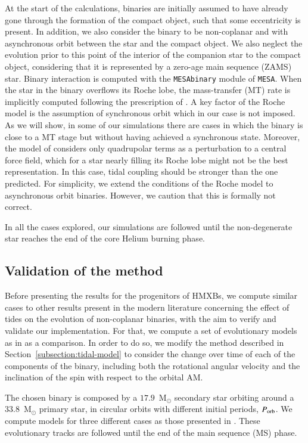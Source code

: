 \documentclass{aa}
\begin{document}
At the start of the calculations, binaries are initially assumed to have already gone through the formation of the compact object, such
that some eccentricity is present. In addition, we also consider the binary to be non-coplanar and with asynchronous orbit between the star
and the compact object. We also neglect the evolution prior to this point of the interior of the companion star to the compact object,
considering that it is represented by a zero-age main sequence (ZAMS) star. Binary interaction is computed with the {\tt MESAbinary} module
of {\tt MESA}. When the star in the binary overflows its Roche lobe, the mass-transfer (MT) rate is implicitly computed following the
prescription of \citet{kolb1990}. A key factor of the Roche model is the assumption of synchronous orbit which in our case is not imposed.
As we will show, in some of our simulations there are cases in which the binary is close to a MT stage but without having achieved a
synchronous state. Moreover, the model of \citet{hut1981} considers only quadrupolar terms as a perturbation to a central force field,
which for a star nearly filling its Roche lobe might not be the best representation. In this case, tidal coupling should be stronger than
the one predicted. For simplicity, we extend the conditions of the Roche model to asynchronous orbit binaries. However, we caution that
this is formally not correct.

In all the cases explored, our simulations are followed until the non-degenerate star reaches the end of the core Helium burning phase.

\subsection{Validation of the method}

Before presenting the results for the progenitors of HMXBs, we compute similar cases to other results present in the modern literature
concerning the effect of tides on the evolution of non-coplanar binaries, with the aim to verify and validate our implementation. For that,
we compute a set of evolutionary models as in \citet{rodriguez2021} as a comparison. In order to do so, we modify the method described in
Section~\ref{subsection:tidal-model} to consider the change over time of each of the components of the binary, including both the
rotational angular velocity and the inclination of the spin with respect to the orbital AM.

The chosen binary is composed by a $17.9$~M$_\odot$ secondary star orbiting around a $33.8$~M$_\odot$ primary star, in circular orbits with
different initial periods, $P_{\rm orb}$. We compute models for three different cases as those presented in \citet{rodriguez2021}. These
evolutionary tracks are followed until the end of the main sequence (MS) phase.
\end{document}
